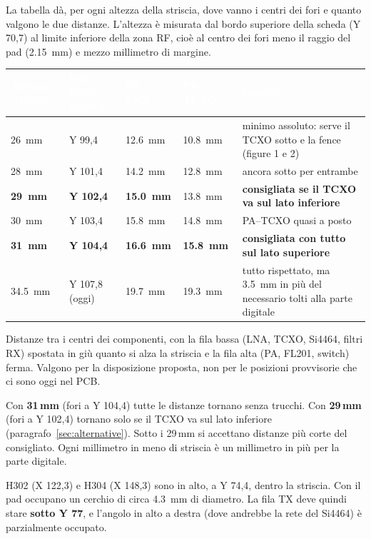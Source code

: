 \documentclass[a4paper,11pt]{article}
\newcommand{\tabhead}{\rowcolor{sbblue}}
\newcommand{\hd}[1]{\textcolor{white}{\sffamily\bfseries\footnotesize #1}}
\begin{document}
La tabella dà, per ogni altezza della striscia, dove vanno i centri dei fori e quanto valgono le due distanze. L'altezza è misurata dal bordo superiore della scheda (Y 70,7) al limite inferiore della zona RF, cioè al centro dei fori meno il raggio del pad (\SI{2.15}{mm}) e mezzo millimetro di margine.

{\small
{}
\begin{xltabular}{\linewidth}{@{}L{24mm}L{30mm}L{22mm}L{24mm}Y@{}}
\tabhead\hd{Altezza striscia}&\hd{Fori H305--H307 a}&\hd{PA -- LNA}&\hd{PA -- TCXO}&\hd{Giudizio}\\
\endhead
\SI{26}{mm} & Y 99,4 & \SI{12.6}{mm} & \SI{10.8}{mm} & minimo assoluto: serve il TCXO sotto e la fence (figure 1 e 2)\\
\SI{28}{mm} & Y 101,4 & \SI{14.2}{mm} & \SI{12.8}{mm} & ancora sotto per entrambe\\
\textbf{\SI{29}{mm}} & \textbf{Y 102,4} & \textbf{\SI{15.0}{mm}} & \SI{13.8}{mm} & \textcolor{sbgreen}{\textbf{consigliata se il TCXO va sul lato inferiore}}\\
\SI{30}{mm} & Y 103,4 & \SI{15.8}{mm} & \SI{14.8}{mm} & PA--TCXO quasi a posto\\
\textbf{\SI{31}{mm}} & \textbf{Y 104,4} & \textbf{\SI{16.6}{mm}} & \textbf{\SI{15.8}{mm}} & \textcolor{sbgreen}{\textbf{consigliata con tutto sul lato superiore}}\\
\SI{34.5}{mm} & Y 107,8 (oggi) & \SI{19.7}{mm} & \SI{19.3}{mm} & tutto rispettato, ma \SI{3.5}{mm} in più del necessario tolti alla parte digitale\\
\bottomrule
\end{xltabular}}
{\footnotesize Distanze tra i centri dei componenti, con la fila bassa (LNA, TCXO, Si4464, filtri RX) spostata in giù quanto si alza la striscia e la fila alta (PA, FL201, switch) ferma. Valgono per la disposizione proposta, non per le posizioni provvisorie che ci sono oggi nel PCB.}

\begin{regola}[in breve]
Con \textbf{31\,mm} (fori a Y 104,4) tutte le distanze tornano senza trucchi. Con \textbf{29\,mm} (fori a Y 102,4) tornano solo se il TCXO va sul lato inferiore (paragrafo~\ref{sec:alternative}). Sotto i 29\,mm si accettano distanze più corte del consigliato. Ogni millimetro in meno di striscia è un millimetro in più per la parte digitale.
\end{regola}

\begin{attenzione}
H302 (X 122,3) e H304 (X 148,3) sono in alto, a Y 74,4, dentro la striscia. Con il pad occupano un cerchio di circa \SI{4.3}{mm} di diametro. La fila TX deve quindi stare \textbf{sotto Y 77}, e l'angolo in alto a destra (dove andrebbe la rete del Si4464) è parzialmente occupato.
\end{attenzione}
\end{document}
